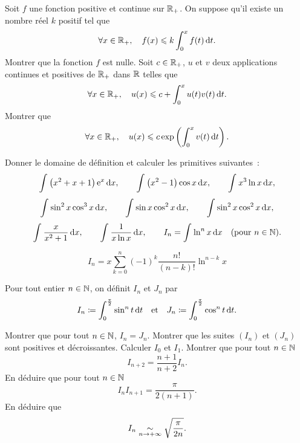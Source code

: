 \documentclass{magnolia}
\begin{document}
\begin{questions}
\question Soit $f$ une fonction positive et continue sur $\mathbb{R}_+$. On suppose
  qu'il existe un nombre réel $k$ positif tel que
  \[\forall x \in\mathbb{R}_+ ,\quad f(x) \leqslant k\int_{0}^{x} f(t)\,\text{d}t.\]
  Montrer que la fonction $f$ est nulle.
\question Soit $c\in\mathbb{R}_+$, $u$ et $v$ deux applications continues et positives
  de $\mathbb{R}_+$ dans $\mathbb{R}$ telles que
  \[\forall x\in\mathbb{R}_+ ,\quad u(x)\leqslant c+\int_{0}^{x} u(t)v(t)\,\text{d}t.\]
  Montrer que
  \[\forall x \in\mathbb{R}_+ ,\quad u(x)\leqslant c\exp\left(\int_{0}^{x} v(t)\,\text{d}t\right).\]
\end{questions}



Donner le domaine de définition et calculer les primitives suivantes~:
\[\int_{}^{} \left(x^2+x+1\right){\rm e}^x\,\text{d}x, \qquad \int_{}^{} \left(x^2-1\right)\cos x\,\text{d}x, \qquad
  \int_{}^{} x^3\ln x\,\text{d}x,\]
\[\int_{}^{} \sin^2 x\cos^3 x\,\text{d}x, \qquad \int_{}^{} \sin x\cos^2 x\,\text{d}x, \qquad
  \int_{}^{} \sin^2 x\cos^2 x\,\text{d}x,\]
\[\int_{}^{} \frac{x}{x^2+1}\,\text{d}x, \qquad \int_{}^{} \frac{1}{x\ln x}\,\text{d}x, \qquad
  I_n=\int_{}^{} \ln^n x\,\text{d}x \quad (\text{pour $n\in\mathbb{N}$}).\]
\begin{sol}
\[I_n=x\sum_{k=0}^n (-1)^k \frac{n!}{(n-k)!}\ln^{n-k} x\]   
\end{sol}

Pour tout entier $n\in\mathbb{N}$, on définit $I_n$ et $J_n$ par
\[I_n\coloneqq\int_{0}^{\frac{\pi}{2}} \sin^n t\,\text{d}t \quad\text{et}\quad
  J_n\coloneqq\int_{0}^{\frac{\pi}{2}} \cos^n t\,\text{d}t.\]
\begin{questions}
\question Montrer que pour tout $n\in\mathbb{N}$, $I_n=J_n$.
\question Montrer que les suites $(I_n)$ et $(J_n)$ sont positives et
  décroissantes. Calculer $I_0$ et $I_1$.
\question Montrer que pour tout $n\in\mathbb{N}$
  \[I_{n+2}=\frac{n+1}{n+2}I_n.\]
\question En déduire que pour tout $n\in\mathbb{N}$
  \[I_n I_{n+1}=\frac{\pi}{2(n+1)}.\]
\question En déduire que
  \[I_n\underset{n\rightarrow+\infty}{\sim}\sqrt{\frac{\pi}{2n}}.\]
\end{questions}
\end{document}
